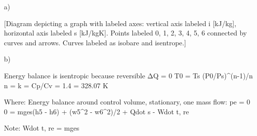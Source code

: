 a) 

[Diagram depicting a graph with labeled axes: vertical axis labeled i [kJ/kg], horizontal axis labeled s [kJ/kgK]. Points labeled 0, 1, 2, 3, 4, 5, 6 connected by curves and arrows. Curves labeled as isobare and isentrope.]

b) 

Energy balance is isentropic because reversible ΔQ = 0  
T0 = Ts (P0/Ps)^(n-1)/n  
n = k = Cp/Cv = 1.4  
= 328.07 K

Where: Energy balance around control volume, stationary, one mass flow:  
pe = 0  
0 = mges(h5 - h6) + (w5^2 - w6^2)/2 + Qdot s - Wdot t, re

Note: Wdot t, re = mges
